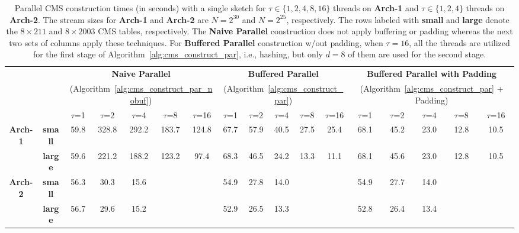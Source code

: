 \documentclass[10pt, conference, compsocconf]{IEEEtran}
\begin{document}
\begin{table}[]
\centering

{\def\arraystretch{1.3}
\begin{tabular}{cc||ccccc|ccccc|ccccc}
                                   &                 & \multicolumn{5}{c|}{\textbf{Naive Parallel}} & \multicolumn{5}{c|}{\textbf{Buffered Parallel}} & \multicolumn{5}{c}{\textbf{Buffered Parallel with Padding}} \\
                                                                      &                 & \multicolumn{5}{c|}{(Algorithm~\ref{alg:cms_construct_par_nobuf})} & \multicolumn{5}{c|}{(Algorithm~\ref{alg:cms_construct_par})} & \multicolumn{5}{c}{(Algorithm~\ref{alg:cms_construct_par} + Padding)} \\

                                   &                 & $\tau$=1   & $\tau$=2    & $\tau$=4    & $\tau$=8    & $\tau$=16  & $\tau$=1   & $\tau$=2   & $\tau$=4   & $\tau$=8   & $\tau$=16  & $\tau$=1   & $\tau$=2   & $\tau$=4   & $\tau$=8   & $\tau$=16 \\ \hline
\multirow{2}{*}{\textbf{Arch-1}} & \textbf{small}  & 59.8  & 328.8  & 292.2  & 183.7  & 124.8 & 67.7  & 57.9  & 40.5  & 27.5  & 25.4  & 68.1  & 45.2  & 23.0    & 12.8  & 10.5 \\
                                   & \textbf{large} & 59.6  & 221.2  & 188.2  & 123.2  & 97.4  & 68.3  & 46.5  & 24.2  & 13.3  & 11.1  & 68.1  & 45.6  & 23.0    & 12.8  & 10.5 \\ \hline
\multirow{2}{*}{\textbf{Arch-2}}  & \textbf{small}  & 56.3  & 30.3   & 15.6   &        &       & 54.9  & 27.8  & 14.0  &       &       & 54.9  & 27.7  & 14.0  &       &      \\
                                   & \textbf{large} & 56.7  & 29.6   & 15.2   &        &       & 52.9  & 26.5  & 13.3  &       &       & 52.8  & 26.4  & 13.4  &       &     
\end{tabular}
}
\caption{Parallel CMS construction times (in seconds) with a single sketch for $\tau \in \{1, 2, 4, 8, 16\}$ threads on \textbf{Arch-1} and  $\tau \in \{1, 2, 4\}$ threads on \textbf{Arch-2}. The stream sizes for \textbf{Arch-1} and \textbf{Arch-2} are $N = 2^{30}$ and $N = 2^{25}$, respectively. The rows labeled with {\bf small} and {\bf large} denote the $8 \times 211$ and $8 \times 2003$ CMS tables, respectively. The {\bf Naive Parallel} construction does not apply buffering or padding whereas the next two sets of columns apply these techniques. For {\bf Buffered Parallel} construction w/out padding, when $\tau = 16$, all the threads are utilized for the first stage of Algorithm~\ref{alg:cms_construct_par}, i.e., hashing, but only $d = 8$ of them are used for the second stage.}\label{tbl:batch}
\end{table}
\end{document}
